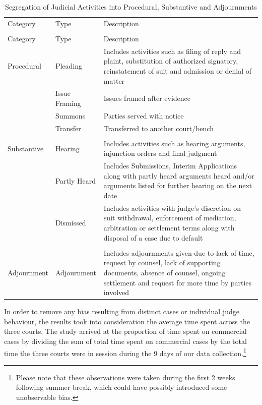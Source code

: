 \documentclass[a4paper, 12pt, twoside]{article}
\begin{document}
\footnotesize
\begin{longtable}[l]
{>{\raggedright}p{2.2cm}>{\raggedright}p{2.5cm}>{\raggedright\arraybackslash}p{9.3cm}}
\caption{Segregation of Judicial Activities into Procedural, Substantive and Adjournments}\\
\toprule
\multicolumn{3}{c}{Judicial Activity}\\
\midrule
Category & Type & Description \\
\midrule
\endfirsthead
\toprule
\multicolumn{3}{c}{Judicial Activity}\\
\midrule
Category & Type & Description \\
\midrule
\endhead
\endfoot
\endlastfoot
Procedural & Pleading & Includes activities such as filing of reply and plaint, substitution of authorized signatory, reinstatement of suit and admission or denial of matter \\
& Issue Framing & Issues framed after evidence \\
& Summons & Parties served with notice \\
& Transfer & Transferred to another court/bench \\
	&	&	\\
Substantive & Hearing & Includes activities such as hearing arguments, injunction orders and final judgment \\
& Partly Heard & Includes Submissions, Interim Applications along with partly heard arguments heard and/or arguments listed for further hearing on the next date \\
& Dismissed & Includes activities with judge’s discretion on suit withdrawal, enforcement of mediation, arbitration or settlement terms along with disposal of a case due to default \\
	&	&	\\
Adjournment & Adjournment & Includes adjournments given due to lack of time, request by counsel, lack of supporting documents, absence of counsel, ongoing settlement and request for more time by parties involved \\
\bottomrule
\end{longtable}
\normalsize

In order to remove any bias resulting from distinct cases or individual judge behaviour, the results took into consideration the average time spent across the three courts. The study arrived at the proportion of time spent on commercial cases by dividing the sum of total time spent on commercial cases by the total time the three courts were in session during the 9 days of our data collection.\footnote{Please note that these observations were taken during the first 2 weeks following summer break, which could have possibly introduced some unobservable bias.}
\end{document}
